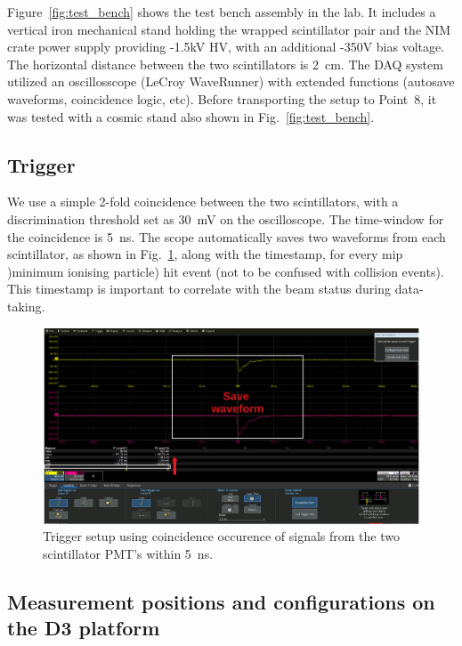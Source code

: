 Figure~\ref{fig:test_bench} shows the test bench assembly in the lab. It includes a vertical iron mechanical stand holding the wrapped scintillator pair and the NIM crate power supply providing -1.5kV HV, with an additional -350V bias voltage. The horizontal distance between the two scintillators is 2~cm. The DAQ system utilized an oscillosscope (LeCroy WaveRunner) with extended functions (autosave waveforms, coincidence logic, etc). Before transporting the setup to Point~8, it was tested with a cosmic stand also shown in Fig.~\ref{fig:test_bench}. 


\subsection{Trigger}
We use a simple 2-fold coincidence between the two scintillators, with a discrimination threshold set as 30~mV on the oscilloscope. The time-window for the coincidence is 5~ns. The scope automatically saves two waveforms from each scintillator, as shown in Fig.~\ref{fig:waveform}, along with the timestamp, for every mip )minimum ionising particle) hit event (not to be confused with collision events). This timestamp is important to correlate with the beam status during data-taking.

\begin{figure}
\centering
    \includegraphics[width=16cm]{figs/INT/waveform.pdf}
\caption{\label{fig:waveform}
    Trigger setup using coincidence occurence of signals from the two scintillator PMT's within 5~ns. 
}
\end{figure}

\subsection{Measurement positions and configurations on the D3 platform}

